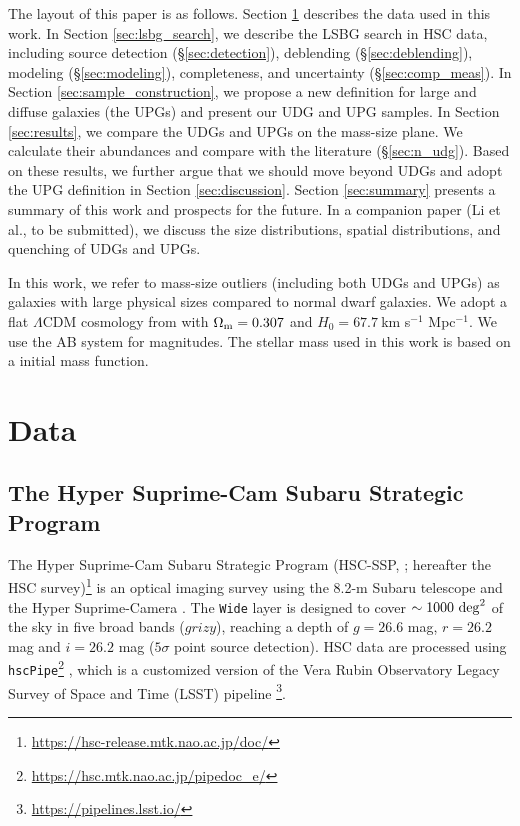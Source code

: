\documentclass[twocolumn,astrosymb,twocolappendix]{aastex631}
\newcommand{\code}[1]{\texttt{#1}}
\begin{document}
\begin{CJK*}{UTF8}{gbsn}

The layout of this paper is as follows. Section \ref{sec:data} describes the data used in this work. In Section \ref{sec:lsbg_search}, we describe the LSBG search in HSC data, including source detection (\S \ref{sec:detection}), deblending (\S \ref{sec:deblending}), modeling (\S \ref{sec:modeling}), completeness, and uncertainty (\S\ref{sec:comp_meas}). In Section \ref{sec:sample_construction}, we propose a new definition for large and diffuse galaxies (the UPGs) and present our UDG and UPG samples. In Section \ref{sec:results}, we compare the UDGs and UPGs on the mass-size plane. We calculate their abundances and compare with the literature (\S \ref{sec:n_udg}). Based on these results, we further argue that we should move beyond UDGs and adopt the UPG definition in Section \ref{sec:discussion}. Section \ref{sec:summary} presents a summary of this work and prospects for the future. In a companion paper (Li et al., to be submitted), we discuss the size distributions, spatial distributions, and quenching of UDGs and UPGs. 

In this work, we refer to mass-size outliers (including both UDGs and UPGs) as galaxies with large physical sizes compared to normal dwarf galaxies. We adopt a flat $\Lambda$CDM cosmology from \citet{Planck15} with $\Omega_{\rm m}= 0.307$ and $H_0 = 67.7\ $km s$^{-1}$ Mpc$^{-1}$. We use the AB system \citep{Oke1983} for magnitudes. The stellar mass used in this work is based on a \citet{Chabrier2003} initial mass function.


\section{Data} \label{sec:data}
\subsection{The Hyper Suprime-Cam Subaru Strategic Program}
The Hyper Suprime-Cam Subaru Strategic Program (HSC-SSP, \citealt{Aihara2018}; hereafter the HSC survey)\footnote{\url{https://hsc-release.mtk.nao.ac.jp/doc/}} is an optical imaging survey using the 8.2-m Subaru telescope and the Hyper Suprime-Camera \citep{Miyazaki2012, Miyazaki2018}. The \texttt{Wide} layer is designed to cover $\sim 1000\ \rm{deg}^{2}$ of the sky in five broad bands ($grizy$), reaching a depth of $g=26.6$ mag, $r=26.2$ mag and $i=26.2$ mag ($5\sigma$ point source detection). HSC data are processed using  \code{hscPipe}\footnote{\url{https://hsc.mtk.nao.ac.jp/pipedoc_e/}} \citep{Bosch2018}, which is a customized version of the Vera Rubin Observatory Legacy Survey of Space and Time (LSST) pipeline \citep{LSST-pipeline}\footnote{\url{https://pipelines.lsst.io/}}.


\end{CJK*}
\end{document}
